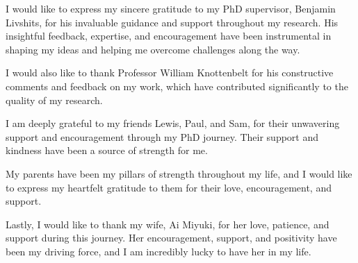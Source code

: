 \cleardoublepage

\begin{acknowledgements}
    I would like to express my sincere gratitude to my PhD supervisor, Benjamin Livshits, for his invaluable guidance and support throughout my research. His insightful feedback, expertise, and encouragement have been instrumental in shaping my ideas and helping me overcome challenges along the way.

    I would also like to thank Professor William Knottenbelt for his constructive comments and feedback on my work, which have contributed significantly to the quality of my research.

    I am deeply grateful to my friends Lewis, Paul, and Sam, for their unwavering support and encouragement through my PhD journey.
    Their support and kindness have been a source of strength for me.

    My parents have been my pillars of strength throughout my life, and I would like to express my heartfelt gratitude to them for their love, encouragement, and support.

    Lastly, I would like to thank my wife, Ai Miyuki, for her love, patience, and support during this journey.
    Her encouragement, support, and positivity have been my driving force, and I am incredibly lucky to have her in my life.
\end{acknowledgements}
